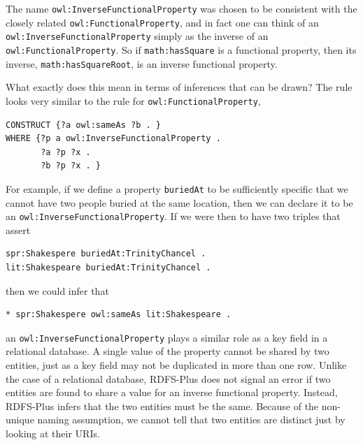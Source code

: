 The name \texttt{owl:InverseFunctionalProperty} was chosen to be consistent with
the closely related \texttt{owl:FunctionalProperty}, and in fact one can think of
an \texttt{owl:InverseFunctionalProperty} simply as the inverse of an
\texttt{owl:FunctionalProperty}. So if \texttt{math:hasSquare} is a functional property,
then its inverse, \texttt{math:hasSquareRoot}, is an inverse functional
property.

What exactly does this mean in terms of inferences that can be drawn?
The rule looks very similar to the rule for \texttt{owl:FunctionalProperty},

\begin{lstlisting}
CONSTRUCT {?a owl:sameAs ?b . }
WHERE {?p a owl:InverseFunctionalProperty .
       ?a ?p ?x .
       ?b ?p ?x . }
\end{lstlisting}

For example, if we define a property \texttt{buriedAt} to be sufficiently
specific that we cannot have two people buried at the same location,
then we can declare it to be an \texttt{owl:InverseFunctionalProperty}. If we
were then to have two triples that assert

\begin{lstlisting}
spr:Shakespere buriedAt:TrinityChancel .
lit:Shakespeare buriedAt:TrinityChancel .
\end{lstlisting}

then we could infer that

\begin{lstlisting}
* spr:Shakespere owl:sameAs lit:Shakespeare .
\end{lstlisting}

an \texttt{owl:InverseFunctionalProperty} plays a similar role as a key field in
a relational database. A single value of the property cannot be shared
by two entities, just as a key field may not be
duplicated in more than one row. Unlike the case of a relational
database, RDFS-Plus does not signal an error if two entities are found
to share a value for an inverse functional property. Instead, RDFS-Plus
infers that the two entities must be the same. Because of the non-unique
naming assumption, we cannot tell that two entities are distinct just by
looking at their URIs.

